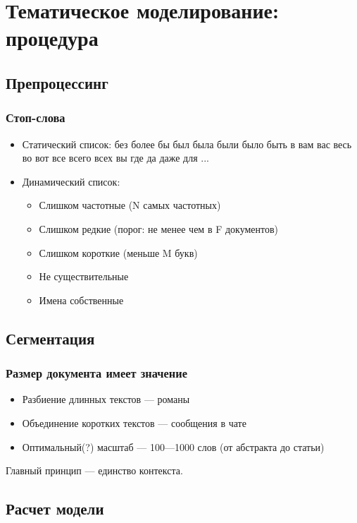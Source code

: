 \documentclass[10pt,svgnames]{beamer}
\begin{document}
\section{Тематическое моделирование: процедура}

\subsection{Препроцессинг}

\begin{frame}
  \frametitle{Стоп-слова}
  \begin{itemize}
  \item Статический список:
без
более
бы
был
была
были
было
быть
в
вам
вас
весь
во
вот
все
всего
всех
вы
где
да
даже
для ...

  \item Динамический список:

    \begin{itemize}
    \item Слишком частотные (N самых частотных)
    \item Слишком редкие (порог: не менее чем в F документов)
    \item Слишком короткие (меньше M букв)
    \item Не существительные
    \item Имена собственные
    \end{itemize}
  \end{itemize}
\end{frame}

\subsection{Сегментация}

\begin{frame}
  \frametitle{Размер документа имеет значение}
  \begin{itemize}
  \item Разбиение длинных текстов — романы
  \item Объединение коротких текстов — сообщения в чате
  \item Оптимальный(?) масштаб — 100—1000 слов (от абстракта до статьи)
  \end{itemize}
  \centering
  \alert{Главный принцип — единство контекста.}
\end{frame}

\subsection{Расчет модели}
\end{document}
